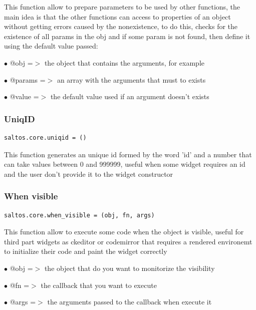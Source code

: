 \documentclass[a4paper]{article}
\begin{document}
This function allow to prepare parameters to be used by other functions, the main idea
is that the other functions can access to properties of an object without getting errors
caused by the nonexistence, to do this, checks for the existence of all params in the obj
and if some param is not found, then define it using the default value passed:

\begin{compactitem}
\item[\color{myblue}$\bullet$] @obj    =$>$ the object that contains the arguments, for example
\item[\color{myblue}$\bullet$] @params =$>$ an array with the arguments that must to exists
\item[\color{myblue}$\bullet$] @value  =$>$ the default value used if an argument doesn't exists
\end{compactitem}

\hypertarget{toc139}{}
\subsubsection{UniqID}

\begin{lstlisting}
saltos.core.uniqid = ()
\end{lstlisting}

This function generates an unique id formed by the word 'id' and a number that can take
values between 0 and 999999, useful when some widget requires an id and the user don't
provide it to the widget constructor

\hypertarget{toc140}{}
\subsubsection{When visible}

\begin{lstlisting}
saltos.core.when_visible = (obj, fn, args)
\end{lstlisting}

This function allow to execute some code when the object is visible, useful for third part
widgets as ckeditor or codemirror that requires a rendered environemt to initialize their
code and paint the widget correctly

\begin{compactitem}
\item[\color{myblue}$\bullet$] @obj  =$>$ the object that do you want to monitorize the visibility
\item[\color{myblue}$\bullet$] @fn   =$>$ the callback that you want to execute
\item[\color{myblue}$\bullet$] @args =$>$ the arguments passed to the callback when execute it
\end{compactitem}
\end{document}
